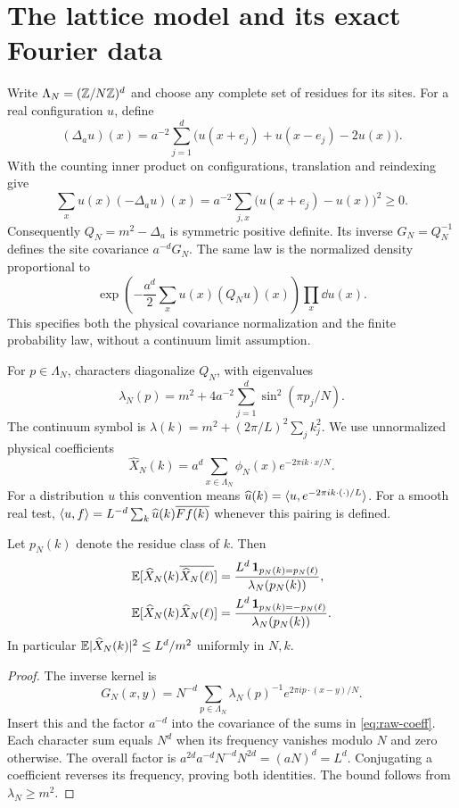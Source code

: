 \section{The lattice model and its exact Fourier data}\label{sec:model}
Write $\Lambda_N=(\mathbb Z/N\mathbb Z)^d$ and choose any complete set of residues for its
sites. For a real configuration $u$, define
\[
 (\Delta_a u)(x)=a^{-2}\sum_{j=1}^d
 \bigl(u(x+e_j)+u(x-e_j)-2u(x)\bigr).
\]
With the counting inner product on configurations, translation and reindexing
give
\[
 \sum_xu(x)(-\Delta_a u)(x)
 =a^{-2}\sum_{j,x}\bigl(u(x+e_j)-u(x)\bigr)^2\geq0.
\]
Consequently $Q_N=m^2-\Delta_a$ is symmetric positive definite. Its inverse
$G_N=Q_N^{-1}$ defines the site covariance $a^{-d}G_N$. The same law is the
normalized density proportional to
\[
 \exp\left(-\frac{a^d}{2}\sum_xu(x)(Q_Nu)(x)\right)\prod_x\dd u(x).
\]
This specifies both the physical covariance normalization and the finite
probability law, without a continuum limit assumption.

For $p\in\Lambda_N$, characters diagonalize $Q_N$, with eigenvalues
\begin{equation}\label{eq:discrete-symbol}
 \lambda_N(p)=m^2+4a^{-2}\sum_{j=1}^d\sin^2(\pi p_j/N).
\end{equation}
The continuum symbol is $\lambda(k)=m^2+(2\pi/L)^2\sum_jk_j^2$.
We use unnormalized physical coefficients
\begin{equation}\label{eq:raw-coeff}
 \widehat X_N(k)=a^d\sum_{x\in\Lambda_N}\phi_N(x)e^{-2\pi i k\cdot x/N}.
\end{equation}
For a distribution $u$ this convention means
$\widehat u(k)=\langle u,e^{-2\pi i k\cdot(\cdot)/L}\rangle$. For a smooth real test,
$\langle u,f\rangle=L^{-d}\sum_k\widehat u(k)\overline{Ff(k)}$ whenever this pairing
is defined.

\begin{lemma}\label{lem:aliases}
Let $p_N(k)$ denote the residue class of $k$. Then
\begin{align}
 \mathbb E[\widehat X_N(k)\overline{\widehat X_N(\ell)}]
 &=\frac{L^d\,\mathbf1_{p_N(k)=p_N(\ell)}}{\lambda_N(p_N(k))},\label{eq:alias-conj}\\
 \mathbb E[\widehat X_N(k)\widehat X_N(\ell)]
 &=\frac{L^d\,\mathbf1_{p_N(k)=-p_N(\ell)}}{\lambda_N(p_N(k))}.\label{eq:alias-noconj}
\end{align}
In particular $\mathbb E\lvert\widehat X_N(k)\rvert^2\leq L^d/m^2$ uniformly in $N,k$.
\end{lemma}
\begin{proof}
The inverse kernel is
\[
 G_N(x,y)=N^{-d}\sum_{p\in\Lambda_N}
 \lambda_N(p)^{-1}e^{2\pi i p\cdot(x-y)/N}.
\]
Insert this and the factor $a^{-d}$ into the covariance of the sums in
\eqref{eq:raw-coeff}. Each character sum equals $N^d$ when its frequency
vanishes modulo $N$ and zero otherwise. The overall factor is
$a^{2d}a^{-d}N^{-d}N^{2d}=(aN)^d=L^d$.
Conjugating a coefficient reverses its frequency, proving both identities.
The bound follows from $\lambda_N\geq m^2$.
\end{proof}

